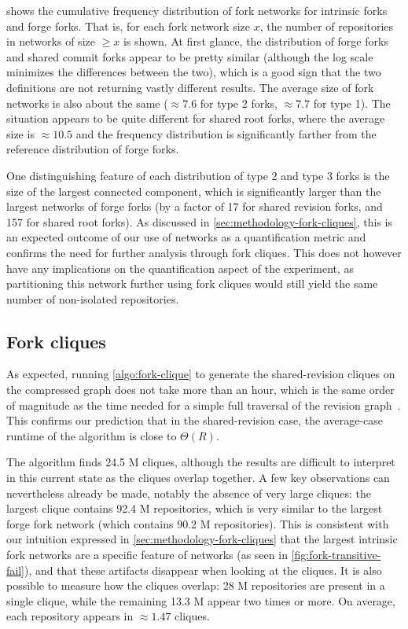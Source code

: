  shows the cumulative frequency
distribution of fork networks for intrinsic forks and forge forks. That is, for
each fork network size $x$, the number of repositories in networks of size
$\geq x$ is shown. At first glance, the distribution of forge forks and shared
commit forks appear to be pretty similar (although the log scale minimizes the
differences between the two), which is a good sign that the two definitions are
not returning vastly different results. The average size of fork networks is
also about the same ($\approx 7.6$ for type 2 forks, $\approx 7.7$ for type 1).
The situation appears to be quite different for shared root forks, where the
average size is $\approx 10.5$ and the frequency distribution is significantly
farther from the reference distribution of forge forks.

One distinguishing feature of each distribution of type 2 and type 3 forks is
the size of the largest connected component, which is significantly larger than
the largest networks of forge forks (by a factor of 17 for shared revision
forks, and 157 for shared root forks). As discussed in
\cref{sec:methodology-fork-cliques}, this is an expected outcome of our
use of networks as a quantification metric and confirms the need for further
analysis through fork cliques.  This does not however have any implications on
the quantification aspect of the experiment, as partitioning this network
further using fork cliques would still yield the same number of non-isolated
repositories.


\subsection{Fork cliques}

As expected, running \cref{algo:fork-clique} to generate the
shared-revision cliques on the compressed graph does not take more than an
hour, which is the same order of magnitude as the time needed for a simple full
traversal of the revision graph~\cite{saner-2020-swh-graph}. This confirms our
prediction that in the shared-revision case, the average-case runtime of the
algorithm is close to $\Theta(R)$.

The algorithm finds 24.5 M cliques, although the results are difficult to
interpret in this current state as the cliques overlap together. A few
key observations can nevertheless already be made, notably the absence of very
large cliques: the largest clique contains 92.4 M repositories, which is very
similar to the largest forge fork network (which contains 90.2 M repositories).
This is consistent with our intuition expressed in
\cref{sec:methodology-fork-cliques} that the largest intrinsic fork
networks are a specific feature of networks (as seen in
\cref{fig:fork-transitive-fail}), and that these artifacts disappear when
looking at the cliques. It is also possible to measure how the cliques overlap:
28 M repositories are present in a single clique, while the remaining 13.3 M
appear two times or more. On average, each repository appears in $\approx 1.47$
cliques.

